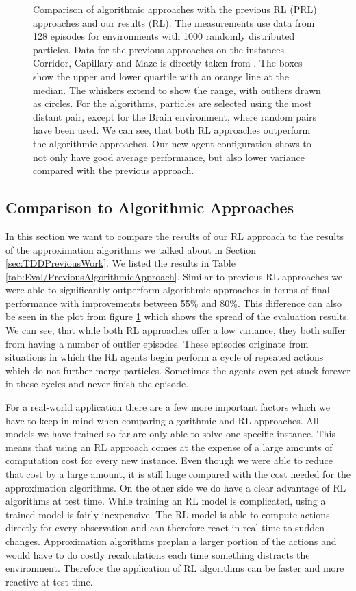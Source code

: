\begin{figure}[ht]
\begin{center}
    \end{center}
    \caption[Comparison of Algorithmic Approaches with RL Approaches]{Comparison of algorithmic approaches with the previous RL (PRL) approaches and our results (RL). The measurements use data from 128 episodes for environments with 1000 randomly distributed particles. Data for the previous approaches on the instances Corridor, Capillary and Maze is directly taken from \cite{becker2020}. The boxes show the upper and lower quartile with an orange line at the median. The whiskers extend to show the range, with outliers drawn as circles. For the algorithms, particles are selected using the most distant pair, except for the Brain environment, where random pairs have been used. We can see, that both RL approaches outperform the algorithmic approaches. Our new agent configuration shows to not only have good average performance, but also lower variance compared with the previous approach.} \label{fig:Eval/Baseline/Boxplot}
\end{figure}

\subsection{Comparison to Algorithmic Approaches} \label{sec:EvalAlgorithms}
In this section we want to compare the results of our RL approach to the results of the approximation algorithms we talked about in Section \ref{sec:TDDPreviousWork}. We listed the results in Table \ref{tab:Eval/PreviousAlgorithmicApproach}. Similar to previous RL approaches we were able to significantly outperform algorithmic approaches in terms of final performance with improvements between 55\% and 80\%. This difference can also be seen in the plot from figure \ref{fig:Eval/Baseline/Boxplot} which shows the spread of the evaluation results. We can see, that while both RL approaches offer a low variance, they both suffer from having a number of outlier episodes. These episodes originate from situations in which the RL agents begin perform a cycle of repeated actions which do not further merge particles. Sometimes the agents even get stuck forever in these cycles and never finish the episode.

For a real-world application there are a few more important factors which we have to keep in mind when comparing algorithmic and RL approaches. All models we have trained so far are only able to solve one specific instance. This means that using an RL approach comes at the expense of a large amounts of computation cost for every new instance. Even though we were able to reduce that cost by a large amount, it is still huge compared with the cost needed for the approximation algorithms. On the other side we do have a clear advantage of RL algorithms at test time. While training an RL model is complicated, using a trained model is fairly inexpensive. The RL model is able to compute actions directly for every observation and can therefore react in real-time to sudden changes. Approximation algorithms preplan a larger portion of the actions and would have to do costly recalculations each time something distracts the environment. Therefore the application of RL algorithms can be faster and more reactive at test time.

